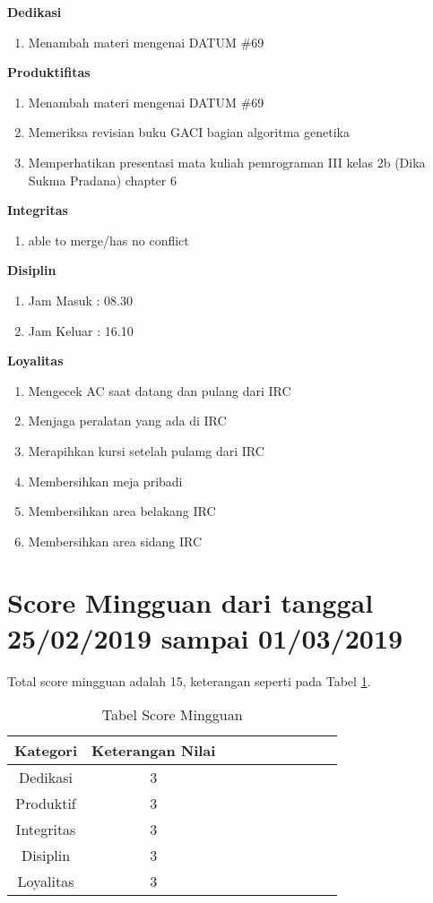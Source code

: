 \begin{enumerate}
\textbf{Dedikasi}
\begin{enumerate}
\item Menambah materi mengenai DATUM \#69
\end{enumerate}

\textbf{Produktifitas}
\begin{enumerate}
\item Menambah materi mengenai DATUM \#69
\item Memeriksa revisian buku GACI bagian algoritma genetika
\item Memperhatikan presentasi mata kuliah pemrograman III kelas 2b (Dika Sukma Pradana) chapter 6
\end{enumerate}

\textbf{Integritas}
\begin{enumerate}
\item able to merge/has no conflict
\end{enumerate}

\textbf{Disiplin}
\begin{enumerate}
\item Jam Masuk : 08.30
\item Jam Keluar : 16.10
\end{enumerate}

\textbf{Loyalitas}
\begin{enumerate}
\item Mengecek AC saat datang dan pulang dari IRC
\item Menjaga peralatan yang ada di IRC
\item Merapihkan kursi setelah pulamg dari IRC
\item Membersihkan meja pribadi
\item Membersihkan area belakang IRC
\item Membersihkan area sidang IRC
\end{enumerate}
\end{enumerate}


\section{Score Mingguan dari tanggal 25/02/2019 sampai 01/03/2019}
Total score mingguan adalah 15, keterangan seperti pada Tabel \ref{table:scoremingguan}.
\begin{table}[!ht]
\centering
\begin{tabular}{ |c|c|c|c|c|c|c|c|c|c| }
\hline
Kategori & Keterangan Nilai \\
\hline
Dedikasi & 3 \\
\hline
Produktif & 3 \\
\hline
Integritas & 3 \\
\hline
Disiplin & 3 \\
\hline
Loyalitas & 3 \\
\hline
\end{tabular}
\caption{Tabel Score Mingguan}
\label{table:scoremingguan}
\end{table}

